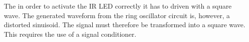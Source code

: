 
The in order to activate the IR LED correctly it has to driven with a square wave. The generated waveform from the ring oscillator circuit is, however, a distorted sinuisoid. The signal must therefore be transformed into a square wave. This requires the use of a signal conditioner.
